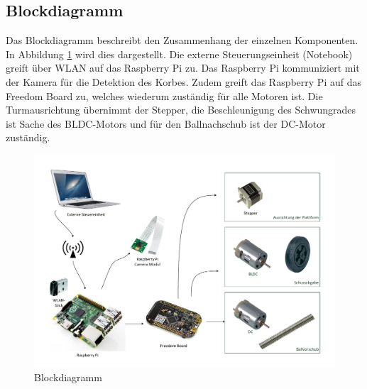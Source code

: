 \subsection{Blockdiagramm}
Das Blockdiagramm beschreibt den Zusammenhang der einzelnen Komponenten. In Abbildung \ref{fig:blockdiagramm} wird dies dargestellt. Die externe Steuerungseinheit (Notebook) greift über WLAN auf das Raspberry Pi zu. Das Raspberry Pi kommuniziert mit der Kamera für die Detektion des Korbes. Zudem greift das Raspberry Pi auf das Freedom Board zu, welches wiederum zuständig für alle Motoren ist. Die Turmausrichtung übernimmt der Stepper, die Beschleunigung des Schwungrades ist Sache des BLDC-Motors und für den Ballnachschub ist der DC-Motor zuständig.

\begin{figure}[h!]
\centering
\includegraphics[width=0.9\linewidth]{../../fig/blockdiagramm}
\caption{Blockdiagramm}
\label{fig:blockdiagramm}
\end{figure}
